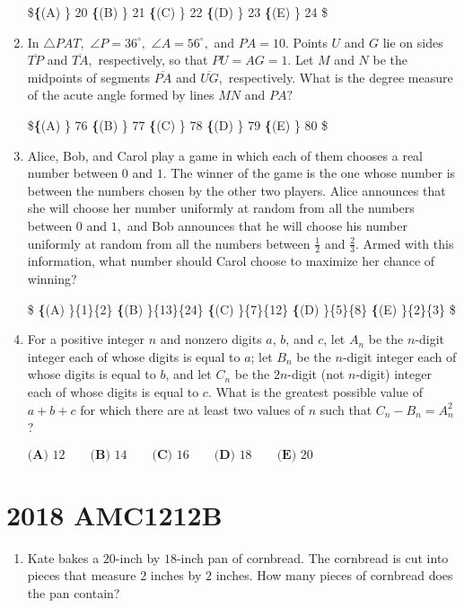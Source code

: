 \documentclass{article}
\begin{document}
\begin{enumerate}[label=\arabic*., itemsep=0.5em]
\$\textbf\{(A) \} 20 \qquad 
\textbf\{(B) \} 21 \qquad 
\textbf\{(C) \} 22 \qquad 
\textbf\{(D) \} 23 \qquad 
\textbf\{(E) \} 24 \$\par \vspace{0.5em}\item In $\triangle PAT,$ $\angle P=36^{\circ},$ $\angle A=56^{\circ},$ and $PA=10.$ Points $U$ and $G$ lie on sides $\overline{TP}$ and $\overline{TA},$ respectively, so that $PU=AG=1.$ Let $M$ and $N$ be the midpoints of segments $\overline{PA}$ and $\overline{UG},$ respectively. What is the degree measure of the acute angle formed by lines $MN$ and $PA?$

\$\textbf\{(A) \} 76 \qquad 
\textbf\{(B) \} 77 \qquad 
\textbf\{(C) \} 78 \qquad 
\textbf\{(D) \} 79 \qquad 
\textbf\{(E) \} 80 \$\par \vspace{0.5em}\item Alice, Bob, and Carol play a game in which each of them chooses a real number between $0$ and $1.$ The winner of the game is the one whose number is between the numbers chosen by the other two players. Alice announces that she will choose her number uniformly at random from all the numbers between $0$ and $1,$ and Bob announces that he will choose his number uniformly at random from all the numbers between $\tfrac{1}{2}$ and $\tfrac{2}{3}.$ Armed with this information, what number should Carol choose to maximize her chance of winning?

\$
\textbf\{(A) \}\frac\{1\}\{2\}\qquad
\textbf\{(B) \}\frac\{13\}\{24\} \qquad
\textbf\{(C) \}\frac\{7\}\{12\} \qquad
\textbf\{(D) \}\frac\{5\}\{8\} \qquad
\textbf\{(E) \}\frac\{2\}\{3\}\qquad
\$\par \vspace{0.5em}\item For a positive integer $n$ and nonzero digits $a$, $b$, and $c$, let $A_n$ be the $n$-digit integer each of whose digits is equal to $a$; let $B_n$ be the $n$-digit integer each of whose digits is equal to $b$, and let $C_n$ be the $2n$-digit (not $n$-digit) integer each of whose digits is equal to $c$. What is the greatest possible value of $a + b + c$ for which there are at least two values of $n$ such that $C_n - B_n = A_n^2$?

$\textbf{(A) } 12 \qquad \textbf{(B) } 14 \qquad \textbf{(C) } 16 \qquad \textbf{(D) } 18 \qquad \textbf{(E) } 20$\par \vspace{0.5em}\end{enumerate}\newpage\section*{2018 AMC1212B}\begin{enumerate}[label=\arabic*., itemsep=0.5em]\item Kate bakes a $20$-inch by $18$-inch pan of cornbread. The cornbread is cut into pieces that measure $2$ inches by $2$ inches. How many pieces of cornbread does the pan contain?


\end{enumerate}
\end{document}
